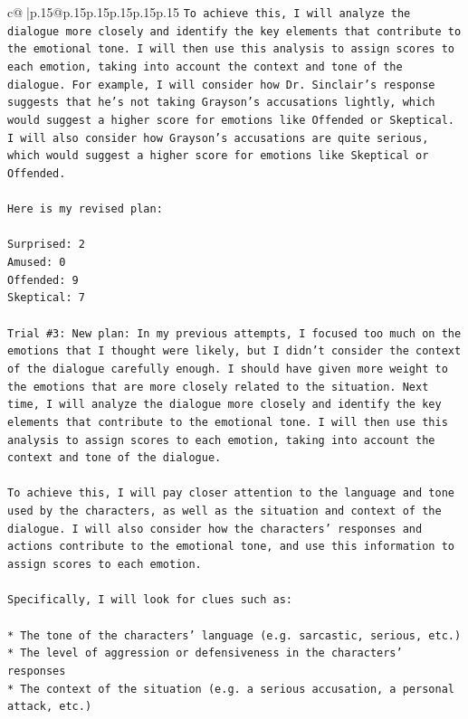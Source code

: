 \documentclass{article}
\begin{document}
{\begin{supertabular}{c@{$\;$}|p{.15\linewidth}@{}p{.15\linewidth}p{.15\linewidth}p{.15\linewidth}p{.15\linewidth}p{.15\linewidth}}
{{{\texttt{To achieve this, I will analyze the dialogue more closely and identify the key elements that contribute to the emotional tone. I will then use this analysis to assign scores to each emotion, taking into account the context and tone of the dialogue. For example, I will consider how Dr. Sinclair's response suggests that he's not taking Grayson's accusations lightly, which would suggest a higher score for emotions like Offended or Skeptical. I will also consider how Grayson's accusations are quite serious, which would suggest a higher score for emotions like Skeptical or Offended.} \\
\\ 
\texttt{Here is my revised plan:} \\
\\ 
\texttt{Surprised: 2} \\
\texttt{Amused: 0} \\
\texttt{Offended: 9} \\
\texttt{Skeptical: 7} \\
\\ 
\texttt{Trial \#3: New plan: In my previous attempts, I focused too much on the emotions that I thought were likely, but I didn't consider the context of the dialogue carefully enough. I should have given more weight to the emotions that are more closely related to the situation. Next time, I will analyze the dialogue more closely and identify the key elements that contribute to the emotional tone. I will then use this analysis to assign scores to each emotion, taking into account the context and tone of the dialogue.} \\
\\ 
\texttt{To achieve this, I will pay closer attention to the language and tone used by the characters, as well as the situation and context of the dialogue. I will also consider how the characters' responses and actions contribute to the emotional tone, and use this information to assign scores to each emotion.} \\
\\ 
\texttt{Specifically, I will look for clues such as:} \\
\\ 
\texttt{* The tone of the characters' language (e.g. sarcastic, serious, etc.)} \\
\texttt{* The level of aggression or defensiveness in the characters' responses} \\
\texttt{* The context of the situation (e.g. a serious accusation, a personal attack, etc.)} \\
}}}
\end{supertabular}}
\end{document}
